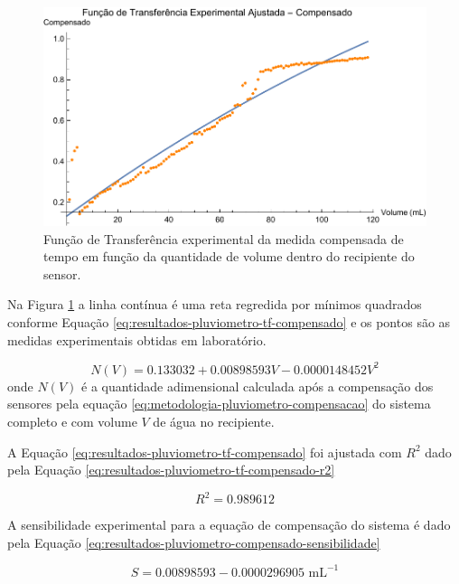 \documentclass[a4paper]{instrumentacao}
\begin{document}
\begin{figure}[H]
	\centering \includegraphics[width=\textwidth]{Nivel/Experimental/Compensado-Ajuste.pdf}
	\caption{Função de Transferência experimental da medida compensada de tempo em função da quantidade de volume dentro do recipiente do sensor.}
	\label{fig:resultados-pluviometro-tf-compensado}
\end{figure}


Na Figura \ref{fig:resultados-pluviometro-tf-compensado} a linha contínua é uma reta regredida por mínimos quadrados conforme Equação \ref{eq:resultados-pluviometro-tf-compensado} e os pontos são as medidas experimentais obtidas em laboratório.

\begin{equation}
	N(V) = 0.133032 + 0.00898593 V - 0.0000148452 V^2
	\label{eq:resultados-pluviometro-tf-compensado}
\end{equation}
\noindent onde $N(V)$ é a quantidade adimensional calculada após a compensação dos sensores pela equação \ref{eq:metodologia-pluviometro-compensacao} do sistema completo e com volume $V$ de água no recipiente.

A Equação \ref{eq:resultados-pluviometro-tf-compensado} foi ajustada com $R^2$ dado pela Equação \ref{eq:resultados-pluviometro-tf-compensado-r2} 

\begin{equation}
	R^2 = 0.989612
	\label{eq:resultados-pluviometro-tf-compensado-r2}
\end{equation}

A sensibilidade experimental para a equação de compensação do sistema é dado pela Equação \ref{eq:resultados-pluviometro-compensado-sensibilidade}

\begin{equation}
	S = 0.00898593 - 0.0000296905 \text{ mL}^{-1}
	\label{eq:resultados-pluviometro-compensado-sensibilidade}
\end{equation}
\end{document}

